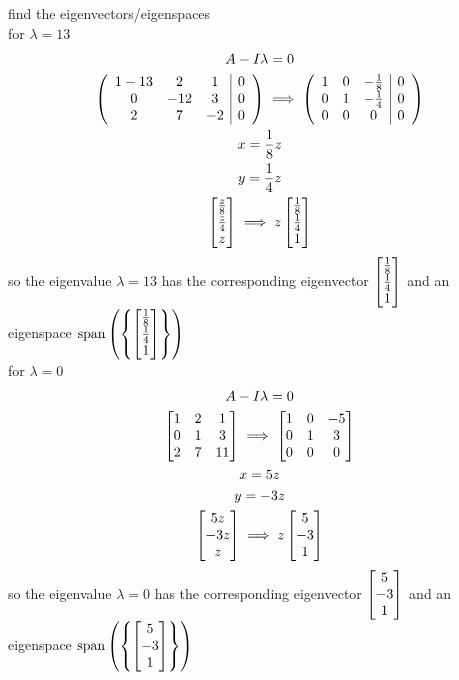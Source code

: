 \documentclass[a4paper,12pt]{article}
\DeclareMathOperator{\spn}{span}
\begin{document}
\begin{definition}
\begin{question}
\begin{subquestion}
\begin{answer}
\begin{step}
find the eigenvectors/eigenspaces\\
for \(\lambda = 13\)\\
\begin{gather*}
  A - I\lambda = 0\\
  \left(\begin{array}{ccc|c} 1-13 & 2 & 1 & 0\\ 0 & -12 & 3 & 0\\ 2 & 7 & -2 & 0 \end{array}\right) \implies \left(\begin{array}{ccc|c} 1 & 0 & -\frac18 & 0\\ 0 & 1 & -\frac14 & 0\\ 0 & 0 & 0 & 0 \end{array}\right)\\
  x = \frac18z\\
  y = \frac14z\\
  \bmqty{\frac{z}{8} \\ \frac{z}{4} \\ z} \implies z\bmqty{\frac{1}{8}\\ \frac{1}{4}\\ 1}
\end{gather*}
so the eigenvalue \(\lambda = 13\) has the corresponding eigenvector \(\bmqty{\frac{1}{8}\\ \frac{1}{4}\\ 1}\) and an eigenspace \(\spn\left(\left\{\bmqty{\frac{1}{8}\\ \frac{1}{4}\\ 1}\right\}\right)\)\\
for \(\lambda = 0\)\\
\begin{gather*}
  A - I\lambda = 0\\
  \bmqty{1 & 2 & 1\\ 0 & 1 & 3\\ 2 & 7 & 11} \implies \bmqty{1 & 0 & -5\\ 0 & 1 & 3\\ 0 & 0 & 0}\\
  x = 5z\\
  y = -3z\\
  \bmqty{5z\\ -3z\\ z} \implies z\bmqty{5\\ -3\\ 1}
\end{gather*}
so the eigenvalue \(\lambda = 0\) has the corresponding eigenvector \(\bmqty{5\\ -3\\ 1}\) and an eigenspace \(\spn\left(\left\{\bmqty{5\\ -3\\ 1}\right\}\right)\)\\
\end{step}
\end{answer}
\end{subquestion}


\end{question}
\end{definition}
\end{document}
